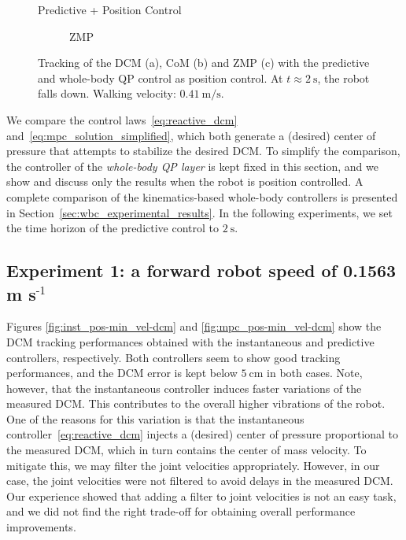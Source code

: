 \begin{figure}[t]
\begin{myframe}{Predictive + Position Control}
\begin{subfigure}[b]{0.49\textwidth}
        \caption{ZMP}
        \label{fig:mpc_pos-max_vel-zmp}
    \end{subfigure}
    \end{myframe}
    \caption{Tracking of the  DCM (a), CoM (b) and ZMP (c) with the predictive and whole-body QP control as position control. At $t\approx \SI{2}{\second}$, the robot falls down.  Walking velocity: $\SI{0.41}{\meter \per \second}$.}
    \vskip-0.5cm
\end{figure}

We compare the control laws~\eqref{eq:reactive_dcm} and~\eqref{eq:mpc_solution_simplified}, which both generate a (desired) center of pressure that attempts to stabilize the desired DCM. To simplify the comparison, the controller of the \emph{whole-body QP layer} is kept fixed in this section, and we show and discuss only the results when the robot is position controlled. A complete comparison of the kinematics-based whole-body controllers is presented in Section~\ref{sec:wbc_experimental_results}.
In the following experiments, we set the time horizon of the predictive control to $\SI{2}{\second}$.

\subsection{Experiment 1: a forward robot speed of 0.1563 m s$^{\text{-1}}$}
Figures \ref{fig:inst_pos-min_vel-dcm} and \ref{fig:mpc_pos-min_vel-dcm} show the DCM tracking performances obtained with the instantaneous and predictive controllers, respectively. Both controllers seem to show good tracking performances, and the DCM error is kept below $\SI{5}{\centi \meter}$ in both cases. Note, however, that the instantaneous controller induces faster variations of the measured DCM. This contributes to the overall higher vibrations of the robot. One of the reasons for this variation is that the instantaneous controller~\eqref{eq:reactive_dcm} injects a (desired) center of pressure proportional to the measured DCM, which in turn contains the center of mass velocity. To mitigate this, we may filter the joint velocities appropriately. However, in our case, the joint velocities were not filtered to avoid delays in the measured DCM. Our experience showed that adding a filter to joint velocities is not an easy task, and we did not find the right trade-off for obtaining overall performance improvements. 

